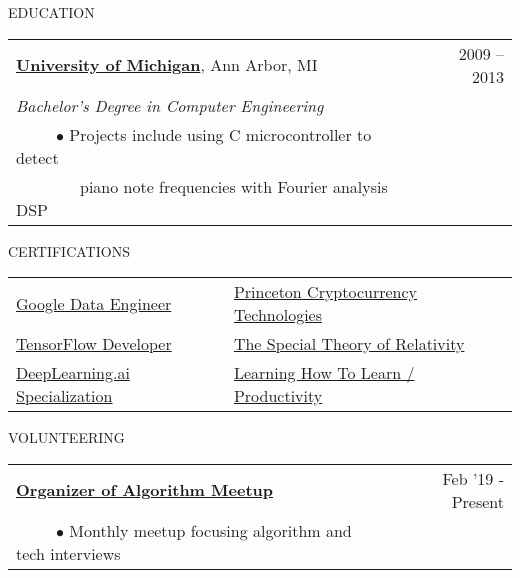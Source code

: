 \documentclass[11pt]{article}
\begin{document}
\vspace{.8cm}
\newpage
{EDUCATION}
\vspace{0.4cm}

\begin{tabularx}{\linewidth}{l X r}
\textbf{\href{https://www.eecs.umich.edu/eecs/undergraduate/}{University of Michigan}}, Ann Arbor, MI & &  2009 -- 2013 \\
\emph{Bachelor's Degree in Computer Engineering} \\
~~~~~$\bullet$ Projects include using C microcontroller to detect  \\
~~~~~~~~piano note frequencies with Fourier analysis DSP\\
\end{tabularx}

\vspace {0.8cm}



{CERTIFICATIONS}
\vspace {0.4cm}

\begin{tabularx}{\linewidth}{X X X}
 \href{https://www.credential.net/672098b8-2c29-4ed8-a4fe-aec082d55316}{Google Data Engineer}&
 
 \href{https://www.dropbox.com/s/h4mbfe9f79o2x32/proof.png?raw=1}{Princeton  Cryptocurrency Technologies} \\

\href{https://coursera.org/share/1f7fbcab2199ace5323637ba261157c4}{TensorFlow Developer} &
 
 \href{https://www.coursera.org/account/accomplishments/certificate/9RBZ3CDBVBND}{The Special Theory of Relativity} \\
 
 \href{https://www.coursera.org/account/accomplishments/specialization/DYW5MPE86QH7}{DeepLearning.ai Specialization} &

\href{https://www.coursera.org/account/accomplishments/certificate/PTADANB8K8UJ}{Learning How To Learn / Productivity} \\

\end{tabularx}

\vspace {0.8cm}

{VOLUNTEERING}
\vspace {0.4cm}

\begin{tabularx}{\linewidth}{l X r}
\textbf{\href{https://chicagopython.github.io/algosig/}{Organizer of Algorithm Meetup}} & & Feb '19 - Present \\
~~~~~$\bullet$ Monthly meetup focusing algorithm and tech interviews\\

\end{tabularx}
\end{document}
